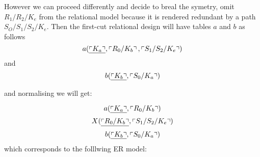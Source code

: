 However we can proceed differently and decide to breal the symetry, omit $R_1/R_2/K_e$  from the relational 
model because it is rendered redundant by a path $S_O/S_1/S_2/K_e$. Then the first-cut relational design will have tables $a$ and $b$ as follows
\begin{equation}
\label{relationa}
a(\underline{\left\ulcorner K_a\right\urcorner},\left\ulcorner R_0/K_b\right\urcorner,\left\ulcorner S_1/S_2/K_e\right\urcorner)
\end{equation}
and
\begin{equation}
\label{relationb}
b(\underline{\left\ulcorner K_b\right\urcorner},\left\ulcorner S_0/K_a\right\urcorner)
\end{equation}

and normalising we will get:

\begin{equation}
\label{normalrelationa}
a(\underline{\left\ulcorner K_a\right\urcorner},\left\ulcorner R_0/K_b\right\urcorner)
\end{equation}
\begin{equation}
\label{relationX}
X(\underline{\left\ulcorner R_0/K_b\right\urcorner},\left\ulcorner S_1/S_2/K_e\right\urcorner)
\end{equation}
\begin{equation}
\label{normalrelationb}
b(\underline{\left\ulcorner K_b\right\urcorner},\left\ulcorner S_0/K_a\right\urcorner)
\end{equation}
which corresponds to the folllwing ER model:


